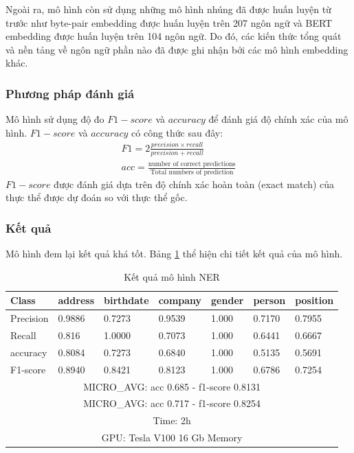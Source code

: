 \documentclass[14pt]{extreport}
\begin{document}
Ngoài ra, mô hình còn sử dụng những mô hình nhúng đã được huấn luyện từ trước như byte-pair embedding được huấn luyện trên 207 ngôn ngữ và BERT embedding được huấn luyện trên 104 ngôn ngữ. Do đó, các kiến thức tổng quát và nền tảng về ngôn ngữ phần nào đã được ghi nhận bởi các mô hình embedding khác.
\subsubsection{Phương pháp đánh giá}
Mô hình sử dụng độ đo $F1-score$ và $accuracy$ để đánh giá độ chính xác của mô hình. $F1-score$ và $accuracy$ có công thức sau đây:
\begin{align}
    F1= 2\frac{precision \times recall}{precision + recall}\\
    acc= \frac{\text{number of correct predictions}}{\text{Total numbers of prediction}}
\end{align}
$F1-score$ được đánh giá dựa trên độ chính xác hoàn toàn (exact match) của thực thể được dự đoán so với thực thể gốc.
\subsubsection{Kết quả}
Mô hình đem lại kết quả khá tốt. Bảng \ref{tab:ner} thể hiện chi tiết kết quả của mô hình.

\begin{table}

\begin{tabular}{ |p{1.7cm}||p{1.6cm}|p{1.8cm}|p{1.7cm}|p{1.5cm}|p{1.5cm}|p{1.7cm}|  }
 \hline
 \hline
 Class & address & birthdate & company & gender & person & position \\
 \hline
 Precision &0.9886 & 0.7273 & 0.9539 & 1.000 & 0.7170 & 0.7955\\
 Recall    &0.816 & 1.0000 & 0.7073 & 1.000 & 0.6441 & 0.6667\\
 accuracy & 0.8084 & 0.7273 & 0.6840 & 1.000 & 0.5135 & 0.5691\\
 F1-score &   0.8940  & 0.8421 & 0.8123 & 1.000 & 0.6786 & 0.7254\\
\hline
 \multicolumn{7}{|c|}{MICRO\_AVG: acc 0.685 - f1-score 0.8131}\\
 \hline
  \multicolumn{7}{|c|}{MICRO\_AVG: acc 0.717 - f1-score 0.8254}\\
  \hline
 \multicolumn{7}{|c|}{Time: 2h}\\
  \hline
 \multicolumn{7}{|c|}{GPU: Tesla V100 16 Gb Memory}   \\
 \hline
\end{tabular}
\caption{Kết quả mô hình NER}
\label{tab:ner}
\end{table}
\end{document}

